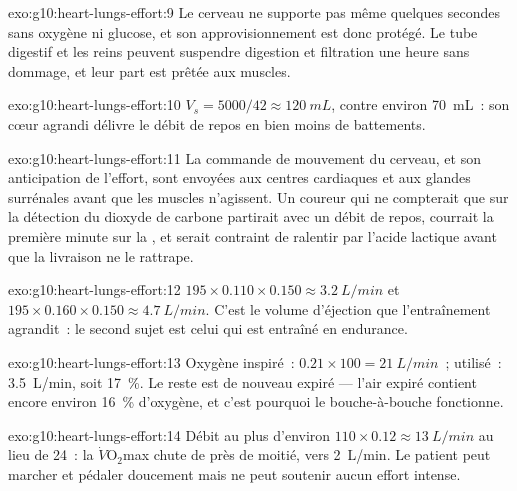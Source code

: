 \begin{solution}{exo:g10:heart-lungs-effort:9}
Le cerveau ne supporte pas même quelques secondes sans oxygène ni
glucose, et son approvisionnement est donc protégé. Le tube digestif et
les reins peuvent suspendre digestion et filtration une heure sans
dommage, et leur part est prêtée aux muscles.
\end{solution}

\begin{solution}{exo:g10:heart-lungs-effort:10}
$V_s = 5000/42 \approx \qty{120}{mL}$, contre environ \qty{70}{mL}~:
son cœur agrandi délivre le débit de repos en bien moins de battements.
\end{solution}

\begin{solution}{exo:g10:heart-lungs-effort:11}
La commande de mouvement du cerveau, et son anticipation de l'effort,
sont envoyées aux centres cardiaques et aux glandes surrénales avant
que les muscles n'agissent. Un coureur qui ne compterait que sur la
détection du dioxyde de carbone partirait avec un débit de repos,
courrait la première minute sur la , et serait contraint de
ralentir par l'acide lactique avant que la livraison ne le rattrape.
\end{solution}

\begin{solution}{exo:g10:heart-lungs-effort:12}
$195 \times 0.110 \times 0.150 \approx \qty{3.2}{L/min}$ et
$195 \times 0.160 \times 0.150 \approx \qty{4.7}{L/min}$. C'est le
volume d'éjection que l'entraînement agrandit~: le second sujet est
celui qui est entraîné en endurance.
\end{solution}

\begin{solution}{exo:g10:heart-lungs-effort:13}
Oxygène inspiré~: $0.21 \times 100 = \qty{21}{L/min}$~; utilisé~:
\qty{3.5}{L/min}, soit 17~\%. Le reste est de nouveau expiré ---
l'air expiré contient encore environ 16~\% d'oxygène, et c'est
pourquoi le bouche-à-bouche fonctionne.
\end{solution}

\begin{solution}{exo:g10:heart-lungs-effort:14}
Débit au plus d'environ $110 \times 0.12 \approx \qty{13}{L/min}$ au
lieu de 24~: la $\dot V\!\mathrm{O_2}$max chute de près de moitié, vers
\qty{2}{L/min}. Le patient peut marcher et pédaler doucement mais ne
peut soutenir aucun effort intense.
\end{solution}

